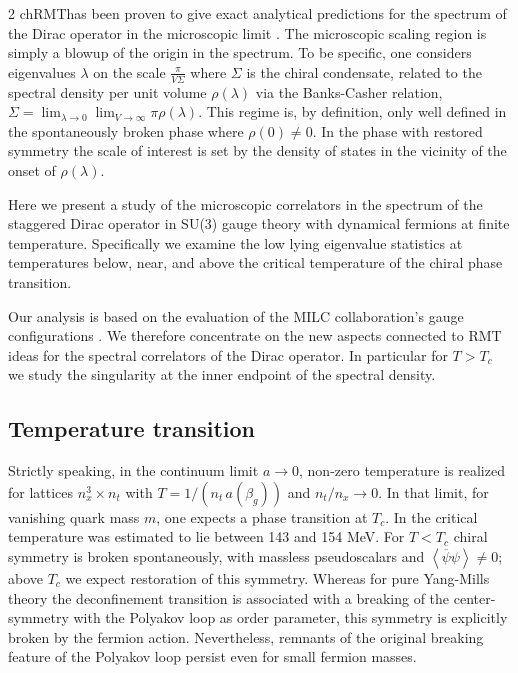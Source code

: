 \begin{multicols}{2}
chRMT\space has been proven to give exact analytical predictions for the
spectrum of the Dirac operator in the microscopic limit \cite{AkDaMa97}. The
microscopic scaling region is simply a blowup of the origin in the spectrum. To
be specific, one considers eigenvalues $\lambda$ on the scale $\frac{\pi}{V
\Sigma}$ where $\Sigma$ is the chiral condensate, related to the spectral
density per unit volume $\rho(\lambda)$ via the Banks-Casher \cite{BaCa80}
relation, $\Sigma = \lim_{\lambda\to 0}\lim_{V\to\infty} \pi \rho(\lambda)$.
This regime is, by definition, only well defined in the spontaneously broken
phase where $\rho(0)\not=0$. In the phase with restored symmetry the scale of
interest is set by the density of states in the vicinity of the onset of
$\rho(\lambda)$.

Here we present a study of the microscopic correlators in the spectrum of the
staggered Dirac operator in SU(3) gauge theory with dynamical fermions at
finite temperature. Specifically we examine the low lying eigenvalue statistics
at temperatures below, near, and above the critical temperature of the chiral
phase transition. 

Our analysis is based on the evaluation of the MILC collaboration's gauge
configurations \cite{MILC96,MILCNERSC}.  We therefore concentrate on the new
aspects connected to RMT ideas for the spectral correlators of the Dirac
operator. In particular for $T>T_c$ we study the singularity at the inner
endpoint of the spectral density.

\subsection{Temperature transition}

Strictly speaking, in the continuum limit $a\to 0$, non-zero temperature is
realized for lattices $n_x^3\times n_t$ with $T=1/(n_t\,a(\beta_g))$ and
$n_t/n_x\to 0$. In that limit, for vanishing quark mass $m$, one expects a
phase transition at $T_c$.  In \cite{MILC96} the critical temperature was
estimated to lie between 143 and 154 MeV. For $T<T_c$ chiral symmetry is broken
spontaneously, with massless pseudoscalars and 
$\left\langle\overline{\psi}\psi\right\rangle\neq 0$; above $T_c$ we expect
restoration of this symmetry. Whereas for pure Yang-Mills theory the
deconfinement transition is associated with a breaking of the center-symmetry
with the Polyakov loop as order parameter, this symmetry is explicitly broken
by the fermion action. Nevertheless, remnants of the original breaking feature
of the Polyakov loop persist even for  small fermion masses.


\end{multicols}
